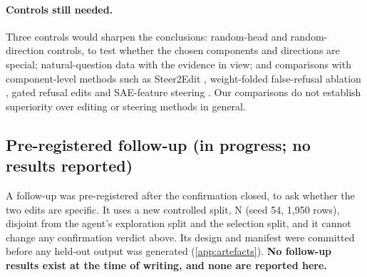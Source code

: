 \paragraph{Controls still needed.}
Three controls would sharpen the conclusions: random-head and random-direction controls, to test whether the chosen
components and directions are special; natural-question data with the evidence in view; and comparisons with
component-level methods such as Steer2Edit \citep{steer2edit2026}, weight-folded false-refusal ablation
\citep{wang2025falserefusal}, gated refusal edits \citep{hinkley2026paving} and SAE-feature steering
\citep{hasanov2026drno}. Our comparisons do not establish superiority over editing or steering methods in general.

\subsection{Pre-registered follow-up (in progress; no results reported)}
\label{sec:followup}

A follow-up was pre-registered after the confirmation closed, to ask whether the two edits are specific. It uses a new
controlled split, N (seed 54, 1,950 rows), disjoint from the agent's exploration split and the selection split, and
it cannot change any confirmation verdict above. Its design and manifest were committed before any held-out output
was generated (\cref{app:artefacts}). \textbf{No follow-up results exist at the time of writing, and none are
reported here.}

